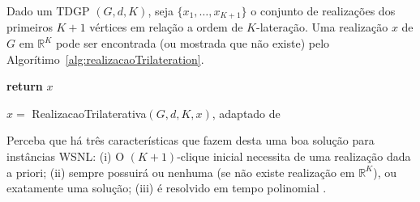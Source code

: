 Dado um TDGP $(G,d,K)$, seja $\{x_1, \dots,x_{K+1}\}$ o conjunto de realizações dos primeiros $K+1$ vértices em relação a ordem de $K$-lateração. Uma realização $x$ de $G$ em $\mathbb{R}^K$ pode ser encontrada (ou mostrada que não existe) pelo Algorítimo~\ref{alg:realizacaoTrilateration}.
\\

\begin{algorithm}[H]
	\label{alg:realizacaoTrilateration}
	\textbf{return} $x$\;
	\caption{$x =$ RealizacaoTrilaterativa$(G,d, K, x)$, adaptado de \cite{libertiEDG}}
\end{algorithm}
\vspace{0.4cm}

Perceba que há três características que fazem desta uma boa solução para instâncias WSNL: (i) O $(K+1)$-clique inicial necessita de uma realização dada a priori; (ii) sempre possuirá ou nenhuma (se não existe realização em $\mathbb{R}^K$), ou exatamente uma solução; (iii) é resolvido em tempo polinomial \cite{libertiEDG}.

